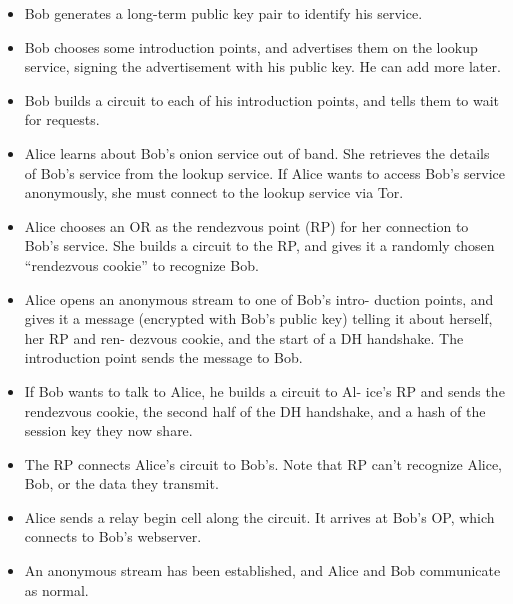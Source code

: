 \documentclass{main}
\begin{document}
\begin{itemize}
    \item Bob generates a long-term public key pair to identify his
    service.
    \item Bob chooses some introduction points, and advertises
    them on the lookup service, signing the advertisement
    with his public key. He can add more later.
    \item Bob builds a circuit to each of his introduction points,
    and tells them to wait for requests.
    \item Alice learns about Bob's onion service out of band. She retrieves
    the details of Bob's service from the lookup service. If
    Alice wants to access Bob's service anonymously, she
    must connect to the lookup service via Tor.
    \item Alice chooses an OR as the rendezvous point (RP) for
    her connection to Bob's service. She builds a circuit
    to the RP, and gives it a randomly chosen “rendezvous
    cookie” to recognize Bob.
    \item Alice opens an anonymous stream to one of Bob's intro-
    duction points, and gives it a message (encrypted with
    Bob's public key) telling it about herself, her RP and ren-
    dezvous cookie, and the start of a DH handshake. The
    introduction point sends the message to Bob.
    \item If Bob wants to talk to Alice, he builds a circuit to Al-
    ice's RP and sends the rendezvous cookie, the second
    half of the DH handshake, and a hash of the session key
    they now share.
    \item The RP connects Alice's circuit to Bob's. Note that RP
    can't recognize Alice, Bob, or the data they transmit.
    \item Alice sends a relay begin cell along the circuit. It arrives
    at Bob's OP, which connects to Bob's webserver.
    \item An anonymous stream has been established, and Alice
    and Bob communicate as normal.

\end{itemize}
\end{document}
